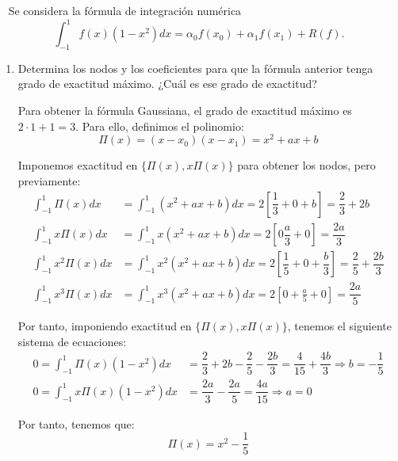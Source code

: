 \begin{ejercicio}~\label{ej:2.3.8}
    Se considera la fórmula de integración numérica
    \begin{equation*}
        \int_{-1}^{1} f(x)(1 - x^2)dx = \alpha_0 f(x_0) + \alpha_1 f(x_1) + R(f).
    \end{equation*}
    \begin{enumerate}
        \item Determina los nodos y los coeficientes para que la fórmula anterior tenga grado de exactitud máximo. ¿Cuál es ese grado de exactitud?
        
        Para obtener la fórmula Gaussiana, el grado de exactitud máximo es $2\cdot 1 + 1 = 3$. Para ello, definimos el polinomio:
        \begin{equation*}
            \Pi(x) = (x - x_0)(x - x_1) = x^2 + ax + b
        \end{equation*}

        Imponemos exactitud en $\{\Pi(x), x\Pi(x)\}$ para obtener los nodos, pero previamente:
        \begin{align*}
            \int_{-1}^{1} \Pi(x)dx &= \int_{-1}^{1} (x^2 + ax + b)dx = 2\left[\dfrac{1}{3} + 0 + b\right] = \dfrac{2}{3} + 2b\\
            \int_{-1}^{1} x\Pi(x)dx &= \int_{-1}^{1} x(x^2 + ax + b)dx = 2\left[0 \dfrac{a}{3} + 0\right] = \dfrac{2a}{3}\\
            \int_{-1}^{1} x^2\Pi(x)dx &= \int_{-1}^{1} x^2(x^2 + ax + b)dx = 2\left[\dfrac{1}{5} + 0 + \dfrac{b}{3}\right] = \dfrac{2}{5} + \dfrac{2b}{3}\\
            \int_{-1}^{1} x^3\Pi(x)dx &= \int_{-1}^{1} x^3(x^2 + ax + b)dx = 2\left[0 + \frac{a}{5} + 0\right] = \dfrac{2a}{5}
        \end{align*}

        Por tanto, imponiendo exactitud en $\{\Pi(x), x\Pi(x)\}$, tenemos el siguiente sistema de ecuaciones:
        \begin{align*}
            0 = \int_{-1}^{1} \Pi(x)(1 - x^2)dx &= \dfrac{2}{3} + 2b - \dfrac{2}{5} - \dfrac{2b}{3} = \dfrac{4}{15} + \dfrac{4b}{3} \Longrightarrow
            b = -\dfrac{1}{5}\\
            0 = \int_{-1}^{1} x\Pi(x)(1 - x^2)dx &= \dfrac{2a}{3} - \dfrac{2a}{5}
            = \dfrac{4a}{15}
            \Longrightarrow a = 0
        \end{align*}

        Por tanto, tenemos que:
        \begin{equation*}
            \Pi(x) = x^2 - \frac{1}{5}
        \end{equation*}


\end{enumerate}
\end{ejercicio}
